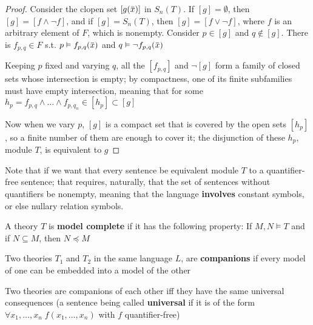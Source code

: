 \documentclass[11pt]{article}
\begin{document}
\begin{proof}
Consider the clopen set \([g(\barx)]\) in \(S_n(T)\). If \([g]=\emptyset\), then \([g]=[f\wedge\neg f]\), and
if \([g]=S_n(T)\), then \([g]=[f\vee\neg f]\), where \(f\) is an arbitrary element of \(F\), which is
nonempty. Consider \(p\in[g]\) and \(q\notin[g]\). There is \(f_{p,q}\in F\) s.t. \(p\vDash f_{p,q}(\barx)\)
and \(q\vDash\neg f_{p,q}(\barx)\)

Keeping \(p\) fixed and varying \(q\), all the \([f_{p,q}]\) and \(\neg[g]\) form a family of
closed sets whose intersection is empty;
by compactness, one of its finite subfamilies must have
empty intersection, meaning that for some \(h_p=f_{p,q}\wedge\dots\wedge f_{p,q_n}\in[h_p]\subset[g]\)

Now when we vary \(p\), \([g]\) is a compact set that is covered by the open sets \([h_p]\), so
a finite number of them are enough to cover it; the disjunction of these \(h_p\), module \(T\),
is equivalent to \(g\)
\end{proof}

Note that if we want that every sentence be equivalent module \(T\) to a quantifier-free
sentence; that requires, naturally, that the set of sentences without quantifiers be nonempty,
meaning that the language \textbf{involves} constant symbols, or else nullary relation symbols.

A theory \(T\) is \textbf{model complete} if it has the following property: If \(M,N\vDash T\) and
if \(N\subseteq M\), then \(N\preceq M\)

Two theories \(T_1\) and \(T_2\) in the same language \(L\), are \textbf{companions} if every model of one
can be embedded into a model of the other

\begin{theorem}[]
Two theories are companions of each other iff they have the same universal consequences (a
sentence being called \textbf{universal} if it is of the form \(\forall x_1,\dots,x_n\;f(x_1,\dots,x_n)\) with \(f\)
quantifier-free)
\end{theorem}
\end{document}
